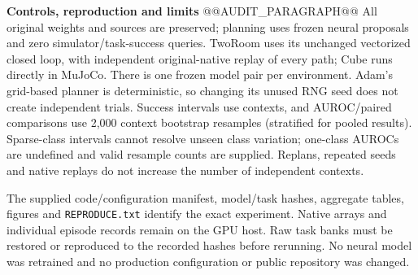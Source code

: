 \documentclass[11pt,a4paper]{article}
\newcommand{\topic}[1]{\par\smallskip\textbf{#1}\quad}
\begin{document}
\topic{Controls, reproduction and limits}
@@AUDIT_PARAGRAPH@@
All original weights and sources are preserved; planning uses frozen neural
proposals and zero simulator/task-success queries. TwoRoom uses its unchanged
vectorized closed loop, with independent original-native replay of every path;
Cube runs directly in MuJoCo. There is one frozen model pair per environment.
Adam's grid-based planner is deterministic, so changing its unused RNG seed does
not create independent trials. Success intervals use contexts, and AUROC/paired
comparisons use 2,000 context bootstrap resamples (stratified for pooled results).
Sparse-class intervals cannot resolve unseen class variation; one-class AUROCs
are undefined and valid resample counts are supplied. Replans, repeated seeds and native replays do not increase the
number of independent contexts.

The supplied code/configuration manifest, model/task hashes, aggregate tables,
figures and \texttt{REPRODUCE.txt} identify the exact experiment. Native arrays
and individual episode records remain on the GPU host. Raw task banks must be
restored or reproduced to the recorded hashes before rerunning. No neural model
was retrained and no production configuration or public repository was changed.
\end{document}
